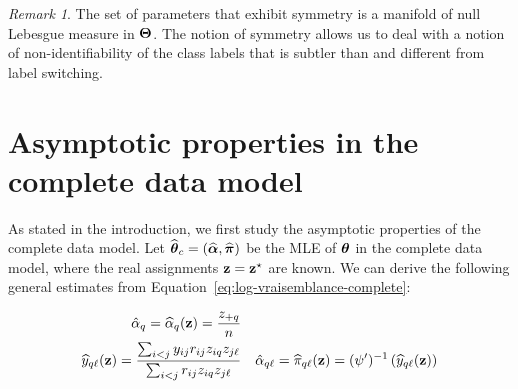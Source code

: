 \documentclass[]{imsart}
\newcommand{\1}{\mathds{1}}
\numberwithin{equation}{section}
\theoremstyle{plain}
\theoremstyle{remark}
\newtheorem{rem}[thm]{Remark}
\begin{document}
\begin{rem}
  The set of parameters that exhibit symmetry is a manifold of null Lebesgue measure in $\boldsymbol{\Theta}$.  The notion of symmetry allows us to deal with a notion of non-identifiability of the class labels that is subtler than and different from label switching.\\
\end{rem}




\section{Asymptotic properties in the complete data model}
\label{sec:mle-complete-likelihood}
As stated in the introduction, we first study the asymptotic properties of the complete data model.
Let $\widehat{\boldsymbol{\theta}}_{c}=\left(\widehat{\boldsymbol{\alpha}},\widehat{\boldsymbol{\pi}}\right)$ be the MLE of $\boldsymbol{\theta}$ in the complete data model, where the real assignments $\mathbf{z}=\mathbf{z}^\star$ are known. We can derive the following general estimates from Equation~\eqref{eq:log-vraisemblance-complete}:

\begin{equation}
  \label{eq:mle-complete-likelihood}
  \begin{aligned}
    \hpi_{q}  = \pizq = \frac{\zsumq}{\n} & \\
    \hyqlz = \frac{\sum_{\ii < \jj} \yij \rrij \ziq \zjl}{\sum_{\ii < \jj} \rrij \ziq \zjl} & \quad
    \hpi_{q\el}  = \pizql = \normpm \left(  \hyqlz \right)
  \end{aligned}
\end{equation}
\end{document}
